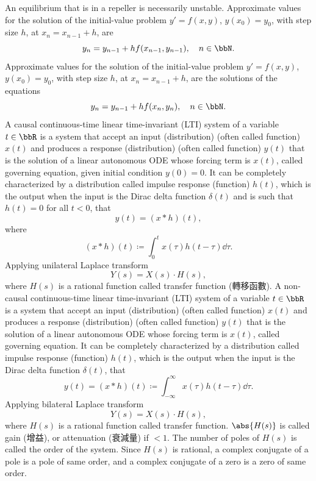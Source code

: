 \documentclass[a4paper,12pt]{report}
\begin{document}
An equilibrium that is in a repeller is necessarily unstable.
Approximate values for the solution of the initial-value problem $y'=f(x,y)$, $y(x_0)=y_0$, with step size $h$, at $x_n=x_{n-1}+h$, are
\[y_n=y_{n-1}+hf(x_{n-1},y_{n-1}),\quad n\in\bbN.\]
Approximate values for the solution of the initial-value problem $y'=f(x,y)$, $y(x_0)=y_0$, with step size $h$, at $x_n=x_{n-1}+h$, are the solutions of the equations
\[y_n=y_{n-1}+hf(x_n,y_n),\quad n\in\bbN.\]
A causal continuous-time linear time-invariant (LTI) system of a variable $t\in\bbR$ is a system that accept an input (distribution) (often called function) $x(t)$ and produces a response (distribution) (often called function) $y(t)$ that is the solution of a linear autonomous ODE whose forcing term is $x(t)$, called governing equation, given initial condition $y(0)=0$. It can be completely characterized by a distribution called impulse response (function) $h(t)$, which is the output when the input is the Dirac delta function $\delta(t)$ and is such that $h(t)=0$ for all $t<0$, that
\[y(t)=(x*h)(t),\]
where
\[(x*h)(t)\coloneq\int_0^tx(\tau)h(t-\tau)\dd{\tau}.\]
Applying unilateral Laplace transform
\[Y(s)=X(s)\cdot H(s),\]
where $H(s)$ is a rational function called transfer function (轉移函數).
A non-causal continuous-time linear time-invariant (LTI) system of a variable $t\in\bbR$ is a system that accept an input (distribution) (often called function) $x(t)$ and produces a response (distribution) (often called function) $y(t)$ that is the solution of a linear autonomous ODE whose forcing term is $x(t)$, called governing equation. It can be completely characterized by a distribution called impulse response (function) $h(t)$, which is the output when the input is the Dirac delta function $\delta(t)$, that
\[y(t)=(x*h)(t)\coloneq\int_{-\infty}^{\infty} x(\tau)h(t-\tau)\dd{\tau}.\]
Applying bilateral Laplace transform
\[Y(s)=X(s)\cdot H(s),\]
where $H(s)$ is a rational function called transfer function.
$\abs{H(s)}$ is called gain (增益), or attenuation (衰減量) if $<1$.
The number of poles of $H(s)$ is called the order of the system.
Since $H(s)$ is rational, a complex conjugate of a pole is a pole of same order, and a complex conjugate of a zero is a zero of same order.
\end{document}
